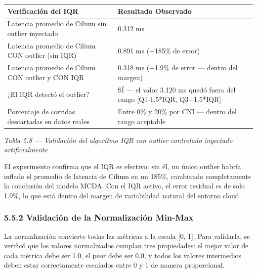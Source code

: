 \documentclass[journal]{IEEEtran}
\begin{document}
\begin{table}[htbp]
\centering
\scriptsize
\begin{tabularx}{\textwidth}{|Y|Y|}
\hline
\textbf{Verificación del IQR} & \textbf{Resultado Observado} \\
\hline
Latencia promedio de Cilium sin outlier inyectado & 0.312 ms \\
Latencia promedio de Cilium CON outlier (sin IQR) & 0.891 ms (+185\% de error) \\
Latencia promedio de Cilium CON outlier y CON IQR & 0.318 ms (+1.9\% de error --- dentro del margen) \\
¿El IQR detectó el outlier? & SÍ --- el valor 3.120 ms quedó fuera del rango [Q1-1.5*IQR, Q3+1.5*IQR] \\
Porcentaje de corridas descartadas en datos reales & Entre 0\% y 20\% por CNI --- dentro del rango aceptable \\
\hline
\end{tabularx}
\end{table}

\begin{center}\emph{\emph{Tabla 5.8 --- Validación del algoritmo IQR con outlier controlado inyectado artificialmente}}\end{center}

El experimento confirma que el IQR es efectivo: sin él, un único outlier habría inflado el promedio de latencia de Cilium en un 185\%, cambiando completamente la conclusión del modelo MCDA. Con el IQR activo, el error residual es de solo 1.9\%, lo que está dentro del margen de variabilidad natural del entorno cloud.

\subsubsection{5.5.2 Validación de la Normalización Min-Max}

La normalización convierte todas las métricas a la escala [0, 1]. Para validarla, se verificó que los valores normalizados cumplan tres propiedades: el mejor valor de cada métrica debe ser 1.0, el peor debe ser 0.0, y todos los valores intermedios deben estar correctamente escalados entre 0 y 1 de manera proporcional.
\end{document}
